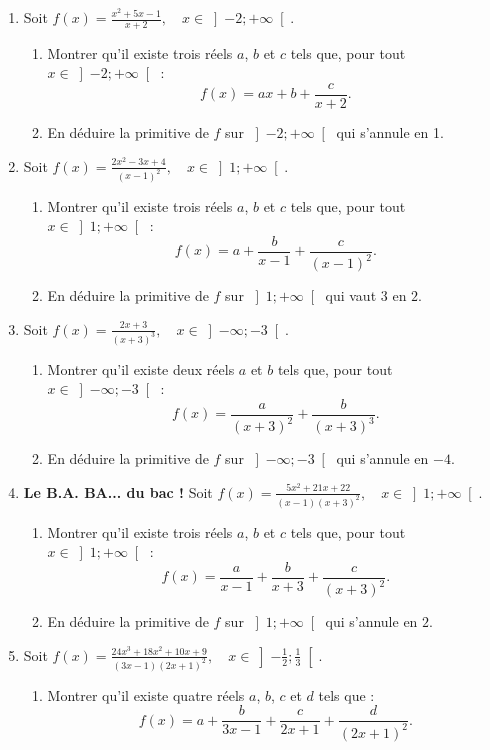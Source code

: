 \documentclass[12pt]{article}
\begin{document}
\begin{enumerate}
    \item Soit $f(x) = \frac{x^2 + 5x - 1}{x + 2}, \quad x \in \left] -2; +\infty \right[.$
    \begin{enumerate}
        \item Montrer qu'il existe trois réels $a$, $b$ et $c$ tels que, pour tout $x \in \left] -2; +\infty \right[$ :
        \[
        f(x) = ax + b + \frac{c}{x + 2}.
        \]

        \item En déduire la primitive de $f$ sur $\left] -2; +\infty \right[$ qui s’annule en 1.
    \end{enumerate}

    \item Soit $f(x) = \frac{2x^2 - 3x + 4}{(x - 1)^2}, \quad x \in \left] 1; +\infty \right[.$
    \begin{enumerate}
    \item Montrer qu'il existe trois réels $a$, $b$ et $c$ tels que, pour tout $x \in \left] 1; +\infty \right[$ :
    \[
    f(x) = a + \frac{b}{x - 1} + \frac{c}{(x - 1)^2}.
    \]
    \item En déduire la primitive de $f$ sur $\left] 1; +\infty \right[$ qui vaut $3$ en $2$.
    \end{enumerate}
       \item Soit $f(x) = \frac{2x + 3}{(x + 3)^3}, \quad x \in \left] -\infty; -3 \right[.$
    \begin{enumerate}
        \item Montrer qu'il existe deux réels $a$ et $b$ tels que, pour tout $x \in \left] -\infty; -3 \right[$ :
        \[
        f(x) = \frac{a}{(x + 3)^2} + \frac{b}{(x + 3)^3}.
        \]

        \item En déduire la primitive de $f$ sur $\left] -\infty; -3 \right[$ qui s’annule en $-4$.
    \end{enumerate}
    \item \textbf{Le B.A. BA... du bac !}
        Soit $f(x) = \frac{5x^2 + 21x + 22}{(x - 1)(x + 3)^2}, \quad x \in \left] 1; +\infty \right[.$
    \begin{enumerate}
        \item Montrer qu’il existe trois réels $a$, $b$ et $c$ tels que, pour tout $x \in \left] 1; +\infty \right[$ :
        \[
        f(x) = \frac{a}{x - 1} + \frac{b}{x + 3} + \frac{c}{(x + 3)^2}.
        \]

        \item En déduire la primitive de $f$ sur $\left] 1; +\infty \right[$ qui s’annule en $2$.
    \end{enumerate}
    \item Soit $f(x) = \frac{24x^3 + 18x^2 + 10x + 9}{(3x - 1)(2x + 1)^2}, \quad x \in \left] -\frac{1}{2}; \frac{1}{3} \right[.$
        \begin{enumerate}
        \item Montrer qu’il existe quatre réels $a$, $b$, $c$ et $d$ tels que :
        \[
        f(x) = a + \frac{b}{3x - 1} + \frac{c}{2x + 1} + \frac{d}{(2x + 1)^2}.
        \]


\end{enumerate}
\end{enumerate}
\end{document}
